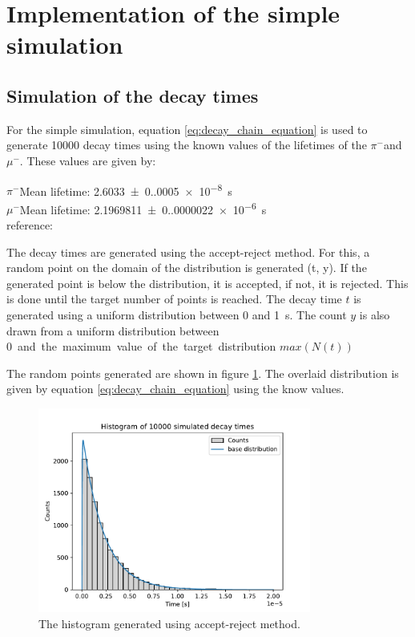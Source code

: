 \documentclass[11pt, a4paper, oneside]{book}
\newcommand\Plotwidth{0.8}
\newcommand{\pion}{$\pi^{-}$}
\newcommand{\muon}{$\mu^{-}$}
\begin{document}
\section{Implementation of the simple simulation}

\subsection{Simulation of the decay times}
For the simple simulation, equation \ref{eq:decay_chain_equation} is used to generate \num{10000} decay times using the known values of the lifetimes of the \pion and \muon. These values are given by:

\pion Mean lifetime: \qty{2.6033(0.0005)e-8}{\s} \\
\muon Mean lifetime: \qty{2.1969811(0.0000022)e-6}{\s} \\
reference: \cite{ParticleDataGroup:2024cfk}


The decay times are generated using the accept-reject method. For this, a random point on the domain of the distribution is generated (t, y). If the generated point is below the distribution, it is accepted, if not, it is rejected. This is done until the target number of points is reached. 
The decay time $t$ is generated using a uniform distribution between 0 and \qty{1}{\s}. The count $y$ is also drawn from a uniform distribution between \qty{0} and the maximum value of the target distribution $max(N(t))$

The random points generated are shown in figure \ref{fig:histogram}. The overlaid distribution is given by equation \ref{eq:decay_chain_equation} using the know values.


\begin{figure}[H]
    \centering
    \includegraphics[width=\Plotwidth\textwidth]{images/simulated_decay_histogram.pdf}
    \caption{The histogram generated using accept-reject method.}
    \label{fig:histogram}
\end{figure}
\end{document}
